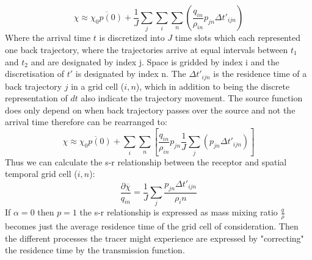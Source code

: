 \begin{equation}\label{eq:discrete_mix_ratio}
    \chi \approx \overline{\chi_0p(0)} + \frac{1}{J} \sum_j \sum_i \sum_n \left(\frac{q_{in}}{\rho_{in}}p_{jn}\Delta t'_{ijn}\right)
\end{equation}
Where the arrival time $t$ is discretized into $J$ time slots which each represented one back trajectory, where the trajectories arrive at equal intervals between $t_1$ and $t_2$ and are designated by index j. Space is gridded by index i and the discretisation of $t'$ is designated by index n. The $\Delta t'_{ijn}$ is the residence time of a back trajectory $j$ in a grid cell ($i,n$), which in addition to being the discrete representation of $dt$ also indicate the trajectory movement. The source function does only depend on when back trajectory passes over the source and not the arrival time therefore  can be rearranged to:
\begin{equation}
    \chi \approx \overline{\chi_0p(0)} + \sum_i \sum_n \left[\frac{q_{in}}{\rho_{in}}p_{jn} \frac{1}{J}\sum_j (p_{jn}\Delta t'_{ijn})\right]
\end{equation}
Thus we can calculate the s-r relationship between the receptor and spatial temporal grid cell ($i,n$):
\begin{equation}
    \frac{\partial \overline{\chi}}{q_{in}} = \frac{1}{J} \sum_j \frac{p_{jn} \Delta t'_{ijn}}{\rho_in}
\end{equation}
If $\alpha=0$ then $p=1$ the s-r relationship is expressed as mass mixing ratio $\frac{q}{\rho}$ becomes just the average residence time of the grid cell of consideration. Then the different processes the tracer might experience are expressed by "correcting" the residence time by the transmission function. 


